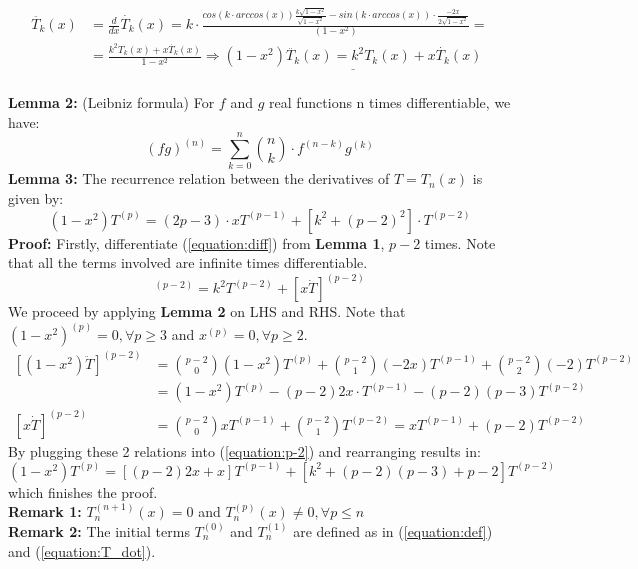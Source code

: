\documentclass[12pt, a4paper]{article}
\begin{document}
\begin{equation*}
\begin{split}
	\ddot{T_{k}}(x) & = \frac{d}{dx}\dot{T_{k}}(x) = k \cdot \frac{cos(k \cdot arccos(x))\frac{k\sqrt{1-x^2}}{\sqrt{1-x^2}} - sin(k \cdot arccos(x)) \cdot \frac{-2x}{2\sqrt{1-x^2}}}{(1-x^2)} = \\
	& = \frac{k^2T_{k}(x) + x\dot{T_{k}}(x)}{1-x^2} \Rightarrow \underline{(1-x^2)\ddot{T_{k}}(x) = k^2T_{k}(x) + x\dot{T_{k}}(x)}
\end{split}
\end{equation*}
\vspace{4.0mm}\\
\textbf{Lemma 2:} (Leibniz formula) For $f$ and $g$ real functions n times differentiable, we have:
\begin{equation*}
	(fg)^{(n)}=\sum_{k=0}^{n}{{{n} \choose {k}} \cdot f^{(n-k)}g^{(k)}}
\end{equation*}
\textbf{Lemma 3:} The recurrence relation between the derivatives of $T=T_{n}(x)$ is given by:
\begin{equation}
	(1-x^2)T^{(p)} = (2p-3) \cdot xT^{(p-1)} + [k^2 + (p-2)^2] \cdot T^{(p-2)}
\label{equation:rec}
\end{equation}
\textbf{Proof:}
Firstly, differentiate (\ref{equation:diff}) from \textbf{Lemma 1}, $p-2$ times. Note that all the terms involved are infinite times differentiable.
\begin{equation}
[(1-x^2)\ddot{T}]^{(p-2)} = k^2T^{(p-2)} + {[x\dot{T}]}^{(p-2)}
\label{equation:p-2}
\end{equation}
We proceed by applying \textbf{Lemma 2} on LHS and RHS. Note that $(1-x^2)^{(p)}=0, \forall p\geq 3 $ and $x^{(p)}=0, \forall p\geq 2 $.
\begin{equation*}
\begin{split}
	[(1-x^2)\ddot{T}]^{(p-2)} & = {{p-2}\choose{0}}(1-x^2)T^{(p)} + {{p-2}\choose{1}}(-2x)T^{(p-1)} + {{p-2}\choose{2}}(-2)T^{(p-2)} \\
	& = (1-x^2)T^{(p)} - (p-2)2x \cdot T^{(p-1)} - (p-2)(p-3)T^{(p-2)} \\
	{[x\dot{T}]}^{(p-2)} & = {{p-2}\choose{0}}xT^{(p-1)} + {{p-2}\choose{1}}T^{(p-2)} = xT^{(p-1)} + (p-2)T^{(p-2)}
\end{split}
\end{equation*}
By plugging these 2 relations into (\ref{equation:p-2}) and rearranging results in:
\begin{equation*}
	(1-x^2)T^{(p)} = [(p-2)2x + x]T^{(p-1)} + [k^2 + (p-2)(p-3) + p-2]T^{(p-2)}
\end{equation*}
which finishes the proof. \\
\textbf{Remark 1:} $T_{n}^{(n+1)}(x)=0$ and $T_{n}^{(p)}(x) \neq 0, \forall p\leq n$ \\
\textbf{Remark 2:} The initial terms $T_{n}^{(0)}$ and $T_{n}^{(1)}$ are defined as in (\ref{equation:def}) and (\ref{equation:T_dot}).
\end{document}
